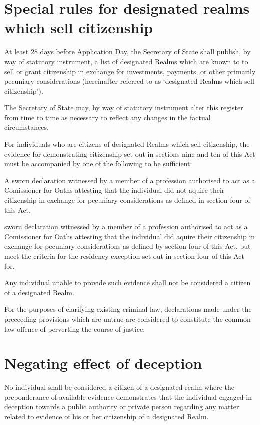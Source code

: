 \documentclass{ukbill}
\begin{document}
\section{Special rules for designated realms which sell citizenship}
\begin{numstat}
	\item At least 28 days before Application Day, the Secretary of State shall publish, by way of statutory instrument, a list of designated Realms which are known to  to sell or grant citizenship in exchange for investments, payments, or other primarily pecuniary considerations (hereinafter referred to as `designated Realms which sell citizenship').
	\item The Secretary of State may, by way of statutory instrument alter this register from time to time as necessary to reflect any changes in the factual circumstances.
	\item For individuals who are citizens of designated Realms which sell citizenship, the evidence for demonstrating citizenship set out in sections nine and ten of this Act must be accompanied by one of the following to be sufficient:
	\begin{alphstat}
		\item A sworn declaration witnessed by a member of a profession authorised to act as a Comissioner for Oaths attesting that the individual did not aquire their citizenship in exchange for pecuniary considerations as defined in section four of this Act.
		\item  sworn declaration witnessed by a member of a profession authorised to act as a Comissioner for Oaths attesting that the individual did aquire their citizenship in exchange for pecuniary considerations as defined by section four of this Act, but meet the criteria for the residency exception set out in section four of this Act for.
	\end{alphstat} 	   
	\item Any individual unable to provide such evidence shall not be considered a citizen of a designated Realm.
	\item For the purposes of clarifying existing criminal law, declarations made under the preceeding provisions which are untrue are considered to constitute the common law offence of perverting the course of justice.
	
\end{numstat}
\section{Negating effect of deception}
\begin{nostat}
	\item  No individual shall be considered a citizen of a designated realm where the preponderance of available evidence demonstrates that the individual engaged in deception towards a public authority or private person regarding any matter related to evidence of his or her citizenship of a designated Realm.
\end{nostat}
\end{document}
